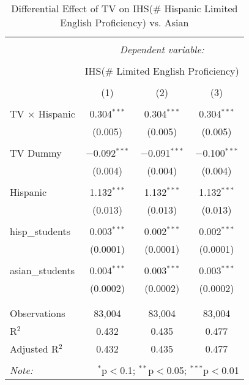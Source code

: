 
\begin{table}[!htbp] \centering 
  \caption{Differential Effect of TV on IHS(\# Hispanic Limited English Proficiency) vs. Asian} 
  \label{} 
\begin{tabular}{@{\extracolsep{-2pt}}lccc} 
\\[-1.8ex]\hline 
\hline \\[-1.8ex] 
 & \multicolumn{3}{c}{\textit{Dependent variable:}} \\ 
\cline{2-4} 
\\[-1.8ex] & \multicolumn{3}{c}{IHS(\# Limited English Proficiency)} \\ 
\\[-1.8ex] & (1) & (2) & (3)\\ 
\hline \\[-1.8ex] 
 TV $\times$ Hispanic & 0.304$^{***}$ & 0.304$^{***}$ & 0.304$^{***}$ \\ 
  & (0.005) & (0.005) & (0.005) \\ 
  & & & \\ 
 TV Dummy & $-$0.092$^{***}$ & $-$0.091$^{***}$ & $-$0.100$^{***}$ \\ 
  & (0.004) & (0.004) & (0.004) \\ 
  & & & \\ 
 Hispanic & 1.132$^{***}$ & 1.132$^{***}$ & 1.132$^{***}$ \\ 
  & (0.013) & (0.013) & (0.013) \\ 
  & & & \\ 
 hisp\_students & 0.003$^{***}$ & 0.002$^{***}$ & 0.002$^{***}$ \\ 
  & (0.0001) & (0.0001) & (0.0001) \\ 
  & & & \\ 
 asian\_students & 0.004$^{***}$ & 0.003$^{***}$ & 0.003$^{***}$ \\ 
  & (0.0002) & (0.0002) & (0.0002) \\ 
  & & & \\ 
\hline \\[-1.8ex] 
Observations & 83,004 & 83,004 & 83,004 \\ 
R$^{2}$ & 0.432 & 0.435 & 0.477 \\ 
Adjusted R$^{2}$ & 0.432 & 0.435 & 0.477 \\ 
\hline 
\hline \\[-1.8ex] 
\textit{Note:}  & \multicolumn{3}{r}{$^{*}$p$<$0.1; $^{**}$p$<$0.05; $^{***}$p$<$0.01} \\ 
\end{tabular} 
\end{table} 
